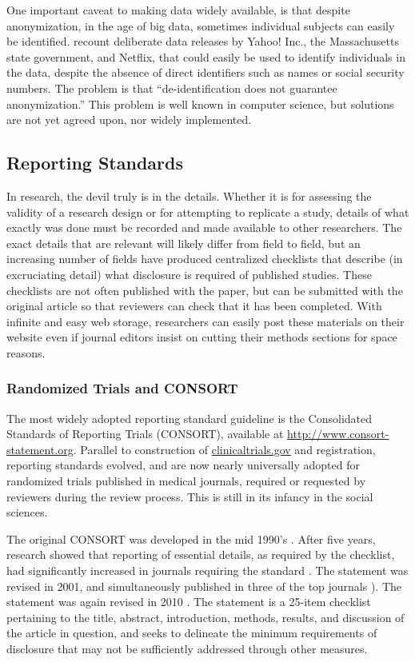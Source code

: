 \documentclass[12pt] {article}
\begin{document}
One important caveat to making data widely available, is that despite
anonymization, in the age of big data, sometimes individual subjects can
easily be identified. \cite{heffetz_privacy_2014} recount deliberate data
releases by Yahoo! Inc., the Massachusetts state government, and
Netflix, that could easily be used to identify individuals in the data,
despite the absence of direct identifiers such as names or social
security numbers. The problem is that ``de-identification does not
guarantee anonymization.'' This problem is well known in computer science, but solutions are not yet agreed upon, nor widely implemented.


\subsection{Reporting Standards}\label{reporting-standards}
In research, the devil truly is in the details. Whether it is for assessing the validity of a research design or for
attempting to replicate a study, details of what exactly was done must be recorded and made available to other researchers.
The exact details that are relevant will likely differ from field to field, but an increasing number of fields have
produced centralized checklists that describe (in excruciating detail) what disclosure is required of published studies. These checklists are not often published with the paper, but can be submitted with the original article so that reviewers can check that it has been completed. With infinite and easy web storage, researchers can easily post these materials on their website even if journal editors insist on cutting their methods sections for space reasons. 

\subsubsection{Randomized Trials and CONSORT}\label{randomized-trials}
The most widely adopted reporting standard guideline is the Consolidated Standards of Reporting Trials (CONSORT), available at \url{http://www.consort-statement.org}. Parallel to construction of \href{http://clinicaltrials.gov}{clinicaltrials.gov} and registration,
reporting standards evolved, and are now nearly universally adopted for randomized trials published in medical journals, required or requested by reviewers during the review process. This is still in its infancy in the social sciences.

The original CONSORT  was developed in the mid 1990's \citep{begg_c_improving_1996}. After five years, research showed that reporting of essential details, as required by the checklist, had significantly increased in journals requiring the standard  \citep{moher_d_use_2001}. The statement was revised in 2001, and simultaneously published in three of the top journals \citep{moher_consort_2001}). The statement was again revised in 2010 \citep{schulz_consort_2010}. The statement is a 25-item checklist pertaining to the title, abstract, introduction, methods, results, and discussion of the article in question, and seeks to delineate the minimum requirements of disclosure that may not be sufficiently addressed through other measures.
\end{document}
